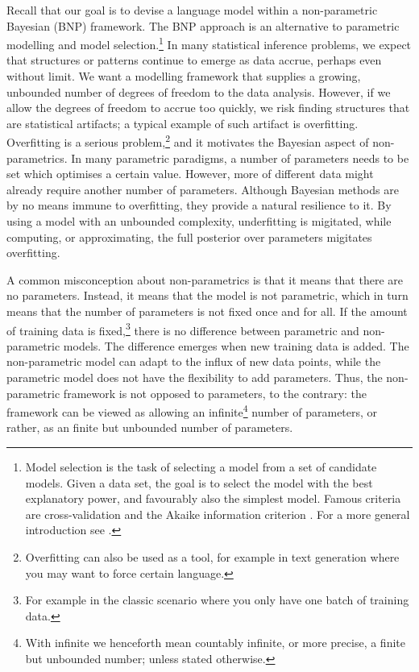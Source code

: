 Recall that our goal is to devise a language model within a non-parametric Bayesian (BNP) framework. The BNP approach is an alternative to parametric modelling and model selection.\footnote[][1em]{Model selection is the task of selecting a model from a set of candidate models. Given a data set, the goal is to select the model with the best explanatory power, and favourably also the simplest model. Famous criteria are cross-validation \citep{Kohavi1995A} and the Akaike information criterion \citep{Bozdogan1987Model}. For a more general introduction see \citep{Burnham2002Model}.}
In many statistical inference problems, we expect that structures or patterns continue to emerge as data accrue, perhaps even without limit. We want a modelling framework that supplies a growing, unbounded number of degrees of freedom to the data analysis. However, if we allow the degrees of freedom to accrue too quickly, we risk finding structures that are statistical artifacts; a typical example of such artifact is overfitting. Overfitting is a serious problem,\footnote{Overfitting can also be used as a tool, for example in text generation where you may want to force certain language.} and it motivates the Bayesian aspect of non-parametrics. In many parametric paradigms, a number of parameters needs to be set which optimises a certain value. However, more of different data might already require another number of parameters. 
Although Bayesian methods are by no means immune to overfitting, they provide a natural resilience to it. By using a model with an unbounded complexity, underfitting is migitated, while computing, or approximating, the full posterior over parameters migitates overfitting.

A common misconception about non-parametrics is that it means that there are no parameters. Instead, it means that the model is not parametric, which in turn means that the number of parameters is not fixed once and for all. If the amount of training data is fixed,\footnote{For example in the classic scenario where you only have one batch of training data.} there is no difference between parametric and non-parametric models. The difference emerges when new training data is added. The non-parametric model can adapt to the influx of new data points, while the parametric model does not have the flexibility to add parameters. Thus, the non-parametric framework is not opposed to parameters, to the contrary: the framework can be viewed as allowing an infinite\footnote{With infinite we henceforth mean countably infinite, or more precise, a finite but unbounded number; unless stated otherwise.} number of parameters, or rather, as an finite but unbounded number of parameters.

